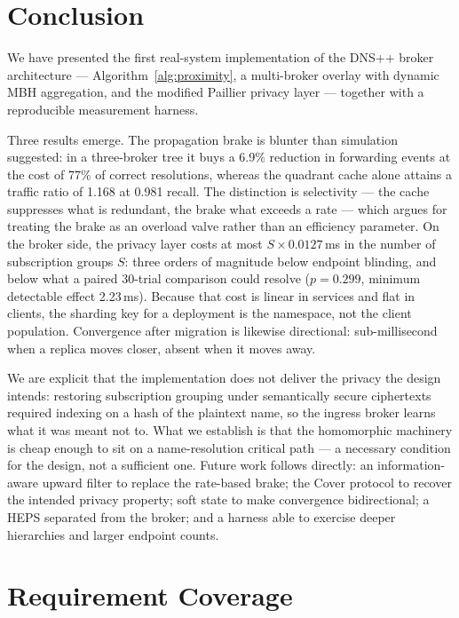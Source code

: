 \documentclass[10pt]{article}
\begin{document}
\section{Conclusion}
\label{sec:conclusion}

We have presented the first real-system implementation of the DNS++ broker architecture --- Algorithm~\ref{alg:proximity}, a multi-broker overlay with dynamic MBH aggregation, and the modified Paillier privacy layer --- together with a reproducible measurement harness.

Three results emerge. The propagation brake is blunter than simulation suggested: in a three-broker tree it buys a 6.9\% reduction in forwarding events at the cost of 77\% of correct resolutions, whereas the quadrant cache alone attains a traffic ratio of 1.168 at 0.981 recall. The distinction is selectivity --- the cache suppresses what is redundant, the brake what exceeds a rate --- which argues for treating the brake as an overload valve rather than an efficiency parameter. On the broker side, the privacy layer costs at most $S \times 0.0127$\,ms in the number of subscription groups $S$: three orders of magnitude below endpoint blinding, and below what a paired 30-trial comparison could resolve ($p = 0.299$, minimum detectable effect 2.23\,ms). Because that cost is linear in services and flat in clients, the sharding key for a deployment is the namespace, not the client population. Convergence after migration is likewise directional: sub-millisecond when a replica moves closer, absent when it moves away.

We are explicit that the implementation does not deliver the privacy the design intends: restoring subscription grouping under semantically secure ciphertexts required indexing on a hash of the plaintext name, so the ingress broker learns what it was meant not to. What we establish is that the homomorphic machinery is cheap enough to sit on a name-resolution critical path --- a necessary condition for the design, not a sufficient one. Future work follows directly: an information-aware upward filter to replace the rate-based brake; the Cover protocol to recover the intended privacy property; soft state to make convergence bidirectional; a HEPS separated from the broker; and a harness able to exercise deeper hierarchies and larger endpoint counts.




\newpage
\appendix

\section{Requirement Coverage}
\label{app:gap}
\end{document}
